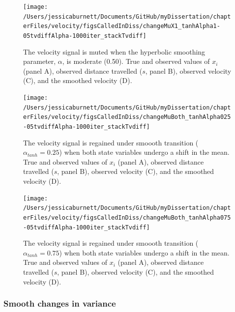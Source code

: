 \documentclass[12pt,twoside,openany]{reedthesis}
\begin{document}
\begin{figure}
\texttt{[image: /Users/jessicaburnett/Documents/GitHub/myDissertation/chapterFiles/velocity/figsCalledInDiss/changeMuX1\_tanhAlpha1-05tvdiffAlpha-1000iter\_stackTvdiff]} \caption{The velocity signal is muted when the  hyperbolic smoothing parameter, $\alpha$, is moderate (0.50). True and observed values of $x_i$ (panel A), observed distance travelled ($s$, panel B), observed velocity (C), and the smoothed velocity (D). }\label{fig:mu1var1}
\end{figure}
\begin{figure}
\texttt{[image: /Users/jessicaburnett/Documents/GitHub/myDissertation/chapterFiles/velocity/figsCalledInDiss/changeMuBoth\_tanhAlpha025-05tvdiffAlpha-1000iter\_stackTvdiff]} \caption{The velocity signal is regained under smoooth transition ($\alpha_{tanh}=0.25$) when both state variables undergo a shift in the mean. True and observed values of $x_i$ (panel A), observed distance travelled ($s$, panel B), observed velocity (C), and the smoothed velocity (D). }\label{fig:muBoth25}
\end{figure}
\begin{figure}
\texttt{[image: /Users/jessicaburnett/Documents/GitHub/myDissertation/chapterFiles/velocity/figsCalledInDiss/changeMuBoth\_tanhAlpha075-05tvdiffAlpha-1000iter\_stackTvdiff]} \caption{The velocity signal is regained under smoooth transition ($\alpha_{tanh}=0.75$) when both state variables undergo a shift in the mean. True and observed values of $x_i$ (panel A), observed distance travelled ($s$, panel B), observed velocity (C), and the smoothed velocity (D). }\label{fig:muBoth75}
\end{figure}
\hypertarget{smooth-changes-in-variance}{%
\subsubsection{Smooth changes in variance}\label{smooth-changes-in-variance}}
\end{document}

